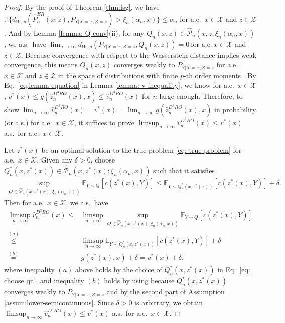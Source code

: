 \documentclass[onefignum,onetabnum]{siamart251216}
\begin{document}
\begin{proof}
    By the proof of Theorem \ref{thm:fsg}, we  have $\mathbb{P} \big\{d_{W,\, p}(\hat{P}_n^{ER}(x,z), P_{Y|X=x, Z=z}) > \xi_n(\alpha_n,x)\big\} \leq \alpha_n$ for a.e.\ $x \in \mathcal{X}$ and $z \in \mathcal{Z}$.
    And by Lemma \ref{lemma: Q conv}(ii), for any $Q_n(x,z) \in \hat{\mathcal{P}}_n(x,z,\xi_n(\alpha_n, x))$, we a.s.\ have
    $\lim_{n \rightarrow \infty}d_{W,\, p}(P_{Y|X=x,Z=z}, \allowbreak Q_n(x,z)) = 0\ \text{for a.e.}\
    x \in \mathcal{X}$ and $z \in \mathcal{Z}.$ 
    Because convergence with respect to the Wasserstein distance implies weak convergence, this means $Q_n(x,z)$ converges weakly to $P_{Y|X=x,Z=z}$ for a.e.\ $x\in\mathcal{X}$ and $z\in\mathcal{Z}$ in the space of distributions with finite $p$-th order moments \citep[][Theorem 6.9]{villani2009optimal}. 
    By Eq.~\eqref{eq:lemma equation} in Lemma \ref{lemma: v inequality}, we know for a.e.\ $x\in\mathcal{X}$, $v^*(x) \leq g(\hat{z}_n^{D^3RO}(x),x) \leq \hat{v}_n^{D^3RO}(x)$ for $n$ large enough.
    Therefore, to show $\lim_{n \rightarrow \infty} \hat{v}_n^{D^3RO}(x) = v^*(x) = \lim_{n \rightarrow \infty} g(\hat{z}^{D^3RO}_n(x),x)$ in probability (or a.s.) for a.e.\ $x \in \mathcal{X}$, it suffices to prove $\limsup_{n \rightarrow \infty} \hat{v}_n^{D^3RO}(x) \leq v^*(x)$ a.s.\ for a.e.\ $x \in \mathcal{X}$. 
    
    Let $z^*(x)$ be an optimal solution to the true problem \eqref{eq: true problem} for a.e.\ $x \in \mathcal{X}$.  Given any $\delta>0$, choose $Q_n^*(x,z^*(x)) \in \hat{\mathcal{P}}_n(x,z^*(x);\xi_n(\alpha_n,x))$ such that it satisfies
    \begin{align}\label{eq: choose qn}
        \sup_{Q \in \hat{\mathcal{P}}_n(x,z^*(x);\xi_n(\alpha_n,x))} \mathbb{E}_{Y\sim Q}[c(z^*(x),Y)] \leq \mathbb{E}_{Y \sim Q_n^*(x,z^*(x))}[c(z^*(x),Y)] + \delta.
    \end{align} 
    Then for a.e.\ $ x \in \mathcal{X}$, we a.s.\ have
    \begin{align*}
        \limsup_{n \rightarrow \infty} \hat{v}_n^{D^3RO}(x)  {\leq}&  \limsup_{n \rightarrow \infty} \sup_{Q \in \hat{\mathcal{P}}_n(x,z^*(x);\xi_n(\alpha_n,x))} \mathbb{E}_{Y \sim Q} [c(z^*(x),Y)] 
        \\
         \overset{(a)}{\leq}& \limsup_{n \rightarrow \infty}\mathbb{E}_{Y \sim Q_n^*(x,z^*(x))} [c(z^*(x),Y)] + \delta 
        \\
        \overset{(b)}{=}& g(z^*(x),x) + \delta 
         = v^*(x) + \delta,
    \end{align*}
    where inequality $(a)$ above holds by the choice of $Q_n^*(x,z^*(x))$ in Eq.~\eqref{eq: choose qn}, and inequality $(b)$ holds by using \citep[][Definition 6.8]{villani2009optimal} because $Q^*_n(x,z^*(x))$ converges weakly to $P_{Y|X=x,Z=z}$ and by the second part of Assumption \ref{assum:lower-semicontinuous}. 
    Since $\delta>0$ is arbitrary, we obtain $\limsup_{n \rightarrow \infty} \hat{v}_n^{D^3RO}(x) \leq v^*(x)$ a.s.\ for a.e.\ $x \in \mathcal{X}$.


\end{proof}
\end{document}

